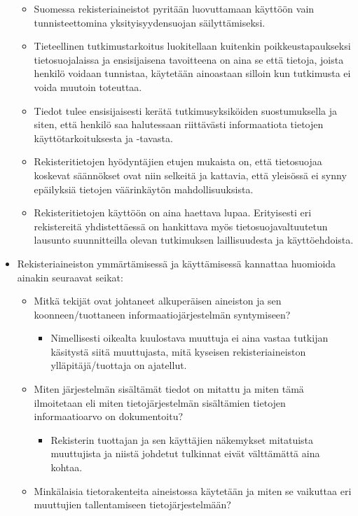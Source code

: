 \documentclass[
]{book}
\providecommand{\tightlist}{%
  \setlength{\itemsep}{0pt}\setlength{\parskip}{0pt}}
\begin{document}
\begin{itemize}
  \begin{itemize}
  \tightlist
  \item
    Suomessa rekisteriaineistot pyritään luovuttamaan käyttöön vain tunnisteettomina yksityisyydensuojan säilyttämiseksi.
  \item
    Tieteellinen tutkimustarkoitus luokitellaan kuitenkin poikkeustapaukseksi tietosuojalaissa ja ensisijaisena tavoitteena on aina se että tietoja, joista henkilö voidaan tunnistaa, käytetään ainoastaan silloin kun tutkimusta ei voida muutoin toteuttaa.
  \item
    Tiedot tulee ensisijaisesti kerätä tutkimusyksiköiden suostumuksella ja siten, että henkilö saa halutessaan riittävästi informaatiota tietojen käyttötarkoituksesta ja -tavasta.
  \item
    Rekisteritietojen hyödyntäjien etujen mukaista on, että tietosuojaa koskevat säännökset ovat niin selkeitä ja kattavia, että yleisössä ei synny epäilyksiä tietojen väärinkäytön mahdollisuuksista.
  \item
    Rekisteritietojen käyttöön on aina haettava lupaa. Erityisesti eri rekistereitä yhdistettäessä on hankittava myös tietosuojavaltuutetun lausunto suunnitteilla olevan tutkimuksen laillisuudesta ja käyttöehdoista.
  \end{itemize}
\item
  Rekisteriaineiston ymmärtämisessä ja käyttämisessä kannattaa huomioida ainakin seuraavat seikat:

  \begin{itemize}
  \tightlist
  \item
    Mitkä tekijät ovat johtaneet alkuperäisen aineiston ja sen koonneen/tuottaneen informaatiojärjestelmän syntymiseen?

    \begin{itemize}
    \tightlist
    \item
      Nimellisesti oikealta kuulostava muuttuja ei aina vastaa tutkijan käsitystä siitä muuttujasta, mitä kyseisen rekisteriaineiston ylläpitäjä/tuottaja on ajatellut.
    \end{itemize}
  \item
    Miten järjestelmän sisältämät tiedot on mitattu ja miten tämä ilmoitetaan eli miten tietojärjestelmän sisältämien tietojen informaatioarvo on dokumentoitu?

    \begin{itemize}
    \tightlist
    \item
      Rekisterin tuottajan ja sen käyttäjien näkemykset mitatuista muuttujista ja niistä johdetut tulkinnat eivät välttämättä aina kohtaa.
    \end{itemize}
  \item
    Minkälaisia tietorakenteita aineistossa käytetään ja miten se vaikuttaa eri muuttujien tallentamiseen tietojärjestelmään?


\end{itemize}
\end{itemize}
\end{document}
